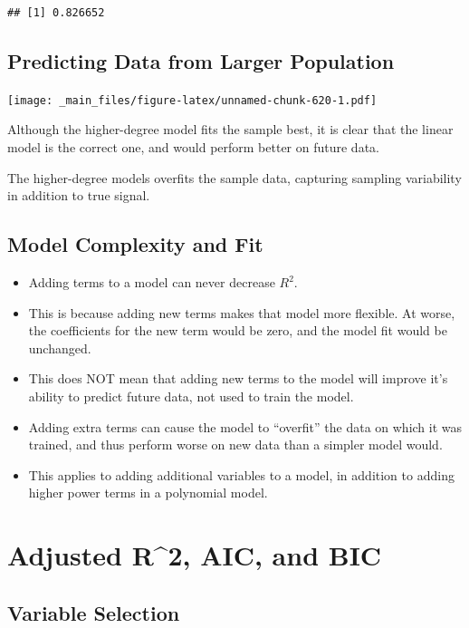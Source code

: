 \documentclass[]{book}
\begin{document}
\begin{verbatim}
## [1] 0.826652
\end{verbatim}

\subsection{Predicting Data from Larger
Population}\label{predicting-data-from-larger-population}

\texttt{[image: \_main\_files/figure-latex/unnamed-chunk-620-1.pdf]}

Although the higher-degree model fits the sample best, it is clear that
the linear model is the correct one, and would perform better on future
data.

The higher-degree models overfits the sample data, capturing sampling
variability in addition to true signal.

\subsection{Model Complexity and Fit}\label{model-complexity-and-fit}

\begin{itemize}
\item
  Adding terms to a model can never decrease \(R^2\).
\item
  This is because adding new terms makes that model more flexible. At
  worse, the coefficients for the new term would be zero, and the model
  fit would be unchanged.
\item
  This does NOT mean that adding new terms to the model will improve
  it's ability to predict future data, not used to train the model.
\item
  Adding extra terms can cause the model to ``overfit'' the data on
  which it was trained, and thus perform worse on new data than a
  simpler model would.
\item
  This applies to adding additional variables to a model, in addition to
  adding higher power terms in a polynomial model.
\end{itemize}

\section{Adjusted R\^{}2, AIC, and BIC}\label{adjusted-r2-aic-and-bic}

\subsection{Variable Selection}\label{variable-selection}
\end{document}
